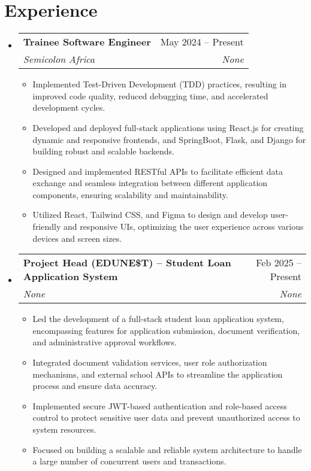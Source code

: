 \documentclass[letterpaper,11pt]{article}
\makeatletter
\newcommand{\resumeItem}[1]{
  \item\small{
    {#1 \vspace{-2pt}}
  }
}
\newcommand{\resumeSubheading}[4]{
  \vspace{-2pt}\item
    \begin{tabular*}{0.97\textwidth}[t]{l@{\extracolsep{\fill}}r}
      \textbf{#1} & #2 \\
      \textit{\small#3} & \textit{\small #4} \\
    \end{tabular*}\vspace{-7pt}
}
\newcommand{\resumeSubHeadingListStart}{\begin{itemize}[leftmargin=0.15in, label={}]}
\newcommand{\resumeSubHeadingListEnd}{\end{itemize}}
\newcommand{\resumeItemListStart}{\begin{itemize}}
\newcommand{\resumeItemListEnd}{\end{itemize}\vspace{-5pt}}
\makeatother
\begin{document}
\section{Experience}
  \resumeSubHeadingListStart
    \resumeSubheading
      {Trainee Software Engineer}{May 2024 -- Present}
      {Semicolon Africa}{None}
      \resumeItemListStart
        \resumeItem{Implemented Test-Driven Development (TDD) practices, resulting in improved code quality, reduced debugging time, and accelerated development cycles.}
        \resumeItem{                                    Developed and deployed full-stack applications using React.js for creating dynamic and responsive frontends, and SpringBoot, Flask, and Django for building robust and scalable backends.}
        \resumeItem{                                    Designed and implemented RESTful APIs to facilitate efficient data exchange and seamless integration between different application components, ensuring scalability and maintainability.}
        \resumeItem{                                    Utilized React, Tailwind CSS, and Figma to design and develop user-friendly and responsive UIs, optimizing the user experience across various devices and screen sizes.}
      \resumeItemListEnd
    \resumeSubheading
      {Project Head (EDUNE\$T) -- Student Loan Application System}{Feb 2025 -- Present}
      {None}{None}
      \resumeItemListStart
        \resumeItem{Led the development of a full-stack student loan application system, encompassing features for application submission, document verification, and administrative approval workflows.}
        \resumeItem{                                    Integrated document validation services, user role authorization mechanisms, and external school APIs to streamline the application process and ensure data accuracy.}
        \resumeItem{                                    Implemented secure JWT-based authentication and role-based access control to protect sensitive user data and prevent unauthorized access to system resources.}
        \resumeItem{                                    Focused on building a scalable and reliable system architecture to handle a large number of concurrent users and transactions.}
      \resumeItemListEnd
  \resumeSubHeadingListEnd

\end{document}

